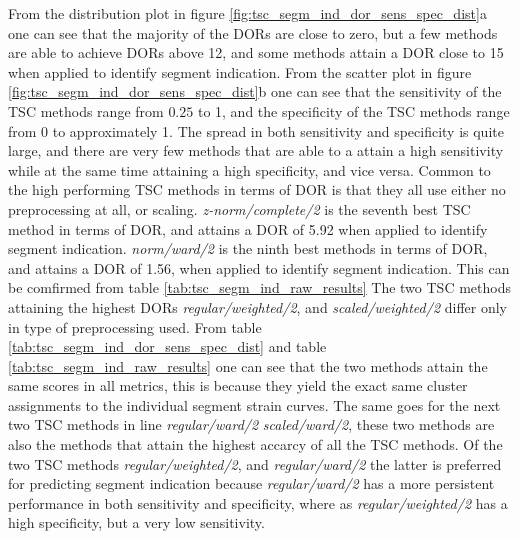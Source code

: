 From the distribution plot in figure \ref{fig:tsc_segm_ind_dor_sens_spec_dist}a one can see that the majority of the DORs are close to zero, 
but a few methods are able to achieve DORs above 12, and some methods attain a DOR close to 15 when applied to identify segment indication.
From the scatter plot in figure \ref{fig:tsc_segm_ind_dor_sens_spec_dist}b one can see that the sensitivity of the TSC methods range from $0.25$ to 1, 
and the specificity of the TSC methods range from 0 to approximately 1. 
The spread in both sensitivity and specificity is quite large, and there are very few methods that are 
able to a attain a high sensitivity while at the same time attaining a high specificity, and vice versa. 
Common to the high performing TSC methods in terms of DOR is that they all use either no preprocessing at all, or scaling.
\textit{z-norm/complete/2} is the seventh best TSC method in terms of DOR, and attains a DOR of 5.92 when applied to identify segment indication. 
\textit{norm/ward/2} is the ninth best methods in terms of DOR, and attains a DOR of 1.56, when applied to identify segment indication.
This can be comfirmed from table \ref{tab:tsc_segm_ind_raw_results}
The two TSC methods attaining the highest DORs \textit{regular/weighted/2}, and \textit{scaled/weighted/2} differ only in type of preprocessing used.
From table \ref{tab:tsc_segm_ind_dor_sens_spec_dist} and table \ref{tab:tsc_segm_ind_raw_results} one can see that the two methods attain the same scores in all metrics,
this is because they yield the exact same cluster assignments to the individual segment strain curves.
The same goes for the next two TSC methods in line \textit{regular/ward/2} \textit{scaled/ward/2}, these two methods are also the methods that attain the highest accarcy of all the TSC methods.
Of the two TSC methods \textit{regular/weighted/2}, and \textit{regular/ward/2} the latter is preferred for predicting segment indication because \textit{regular/ward/2} has a more persistent
performance in both sensitivity and specificity, where as \textit{regular/weighted/2} has a high specificity, but a very low sensitivity.

